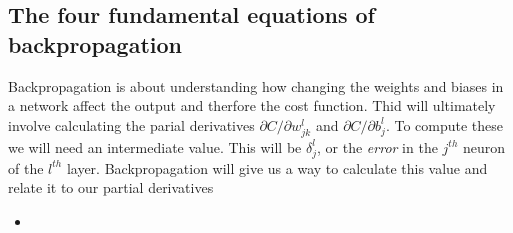 \documentclass[a4paper,12pt]{article}
\begin{document}
\subsection{The four fundamental equations of backpropagation}
Backpropagation is about understanding how changing the weights and biases in a network affect the output and therfore the cost function. Thid will ultimately involve calculating the parial derivatives $\partial C/\partial w^l_{jk}$ and $\partial C/\partial b^l_j$. To compute these we will need an intermediate value. This will be $\delta^l_j$, or the \textit{error} in the $j^{th}$ neuron of the $l^{th}$ layer. Backpropagation will give us a way to calculate this value and relate it to our partial derivatives
\begin{itemize}
	\item 
\end{itemize}
\end{document}
